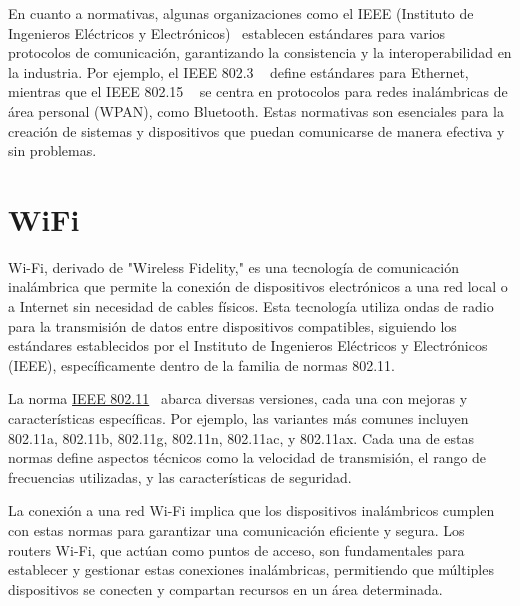 En cuanto a normativas, algunas organizaciones como el IEEE (Instituto de Ingenieros Eléctricos y Electrónicos)~\cite{misc:IEEE} establecen estándares para varios protocolos de comunicación, garantizando la consistencia y la interoperabilidad en la industria. Por ejemplo, el IEEE 802.3 ~\cite{misc:IEEE802_3} define estándares para Ethernet, mientras que el IEEE 802.15 ~\cite{misc:IEEE802_15} se centra en protocolos para redes inalámbricas de área personal (WPAN), como Bluetooth. Estas normativas son esenciales para la creación de sistemas y dispositivos que puedan comunicarse de manera efectiva y sin problemas.

\section{WiFi}\label{concepto:WIFI}
Wi-Fi, derivado de "Wireless Fidelity," es una tecnología de comunicación inalámbrica que permite la conexión de dispositivos electrónicos a una red local o a Internet sin necesidad de cables físicos. Esta tecnología utiliza ondas de radio para la transmisión de datos entre dispositivos compatibles, siguiendo los estándares establecidos por el Instituto de Ingenieros Eléctricos y Electrónicos (IEEE), específicamente dentro de la familia de normas 802.11.

La norma \underline{IEEE 802.11}~\cite{manual:IEEE802.11} abarca diversas versiones, cada una con mejoras y características específicas. Por ejemplo, las variantes más comunes incluyen 802.11a, 802.11b, 802.11g, 802.11n, 802.11ac, y 802.11ax. Cada una de estas normas define aspectos técnicos como la velocidad de transmisión, el rango de frecuencias utilizadas, y las características de seguridad.

La conexión a una red Wi-Fi implica que los dispositivos inalámbricos cumplen con estas normas para garantizar una comunicación eficiente y segura. Los routers Wi-Fi, que actúan como puntos de acceso, son fundamentales para establecer y gestionar estas conexiones inalámbricas, permitiendo que múltiples dispositivos se conecten y compartan recursos en un área determinada.
